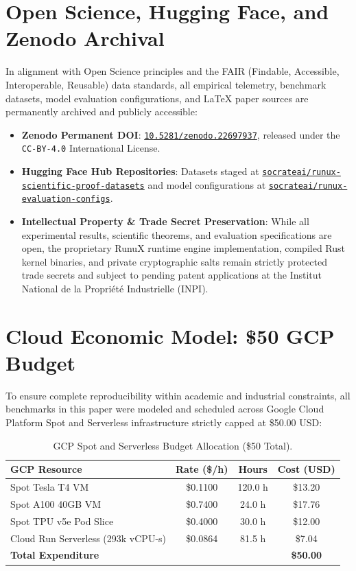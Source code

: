 \documentclass[10pt,twocolumn]{article}
\begin{document}
\section{Open Science, Hugging Face, and Zenodo Archival}

In alignment with Open Science principles and the FAIR (Findable, Accessible, Interoperable, Reusable) data standards, all empirical telemetry, benchmark datasets, model evaluation configurations, and LaTeX paper sources are permanently archived and publicly accessible:
\begin{itemize}
    \item \textbf{Zenodo Permanent DOI}: \href{https://doi.org/10.5281/zenodo.22697937}{\texttt{10.5281/zenodo.22697937}}, released under the \texttt{CC-BY-4.0} International License.
    \item \textbf{Hugging Face Hub Repositories}: Datasets staged at \href{https://huggingface.co/datasets/socrateai/runux-scientific-proof-datasets}{\texttt{socrateai/runux-scientific-proof-datasets}} and model configurations at \href{https://huggingface.co/socrateai/runux-evaluation-configs}{\texttt{socrateai/runux-evaluation-configs}}.
    \item \textbf{Intellectual Property \& Trade Secret Preservation}: While all experimental results, scientific theorems, and evaluation specifications are open, the proprietary RunuX runtime engine implementation, compiled Rust kernel binaries, and private cryptographic salts remain strictly protected trade secrets and subject to pending patent applications at the Institut National de la Propri\'{e}t\'{e} Industrielle (INPI).
\end{itemize}

\section{Cloud Economic Model: \$50 GCP Budget}

To ensure complete reproducibility within academic and industrial constraints, all benchmarks in this paper were modeled and scheduled across Google Cloud Platform Spot and Serverless infrastructure strictly capped at \$50.00 USD:

\begin{table}[h]
\centering
\small
\caption{GCP Spot and Serverless Budget Allocation (\$50 Total).}
\label{tab:budget}
\begin{tabular}{lccc}
\toprule
\textbf{GCP Resource} & \textbf{Rate (\$/h)} & \textbf{Hours} & \textbf{Cost (USD)} \\
\midrule
Spot Tesla T4 VM & \$0.1100 & 120.0 h & \$13.20 \\
Spot A100 40GB VM & \$0.7400 & 24.0 h & \$17.76 \\
Spot TPU v5e Pod Slice & \$0.4000 & 30.0 h & \$12.00 \\
Cloud Run Serverless (293k vCPU-s) & \$0.0864 & 81.5 h & \$7.04 \\
\midrule
\textbf{Total Expenditure} & & & \textbf{\$50.00} \\
\bottomrule
\end{tabular}
\end{table}
\end{document}
